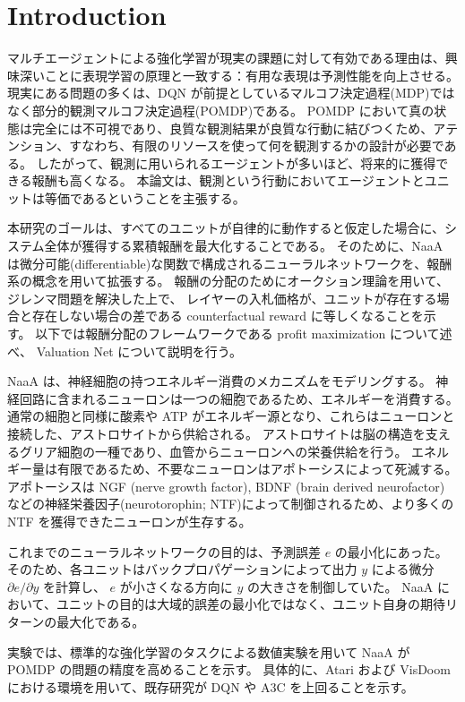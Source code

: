 \section{Introduction}


マルチエージェントによる強化学習が現実の課題に対して有効である理由は、興味深いことに表現学習の原理と一致する：有用な表現は予測性能を向上させる。
現実にある問題の多くは、DQN が前提としているマルコフ決定過程(MDP)ではなく部分的観測マルコフ決定過程(POMDP)である\citep[p.258]{sutton1998reinforcement}。
POMDP において真の状態は完全には不可視であり、良質な観測結果が良質な行動に結びつくため、アテンション、すなわち、有限のリソースを使って何を観測するかの設計が必要である。
したがって、観測に用いられるエージェントが多いほど、将来的に獲得できる報酬も高くなる。
本論文は、観測という行動においてエージェントとユニットは等価であるということを主張する。


本研究のゴールは、すべてのユニットが自律的に動作すると仮定した場合に、システム全体が獲得する累積報酬を最大化することである。
そのために、NaaA は微分可能(differentiable)な関数で構成されるニューラルネットワークを、報酬系の概念を用いて拡張する。
報酬の分配のためにオークション理論を用いて、ジレンマ問題を解決した上で、
レイヤーの入札価格が、ユニットが存在する場合と存在しない場合の差である counterfactual reward \citep{agogino2006quicr} に等しくなることを示す。
以下では報酬分配のフレームワークである profit maximization について述べ、
Valuation Net について説明を行う。

NaaA は、神経細胞の持つエネルギー消費のメカニズムをモデリングする。
神経回路に含まれるニューロンは一つの細胞であるため、エネルギーを消費する。
通常の細胞と同様に酸素や ATP がエネルギー源となり、これらはニューロンと接続した、アストロサイトから供給される。
アストロサイトは脳の構造を支えるグリア細胞の一種であり、血管からニューロンへの栄養供給を行う。
エネルギー量は有限であるため、不要なニューロンはアポトーシスによって死滅する。
アポトーシスは NGF (nerve growth factor), BDNF (brain derived neurofactor) などの神経栄養因子(neurotorophin; NTF)によって制御されるため、より多くの NTF を獲得できたニューロンが生存する。

これまでのニューラルネットワークの目的は、予測誤差 $e$ の最小化にあった。
そのため、各ユニットはバックプロパゲーションによって出力 $y$ による微分 $\partial e / \partial y$ を計算し、
$e$ が小さくなる方向に $y$ の大きさを制御していた。
NaaA において、ユニットの目的は大域的誤差の最小化ではなく、ユニット自身の期待リターンの最大化である。

実験では、標準的な強化学習のタスクによる数値実験を用いて NaaA が POMDP の問題の精度を高めることを示す。
具体的に、Atari および VisDoom における環境を用いて、既存研究が DQN や A3C を上回ることを示す。
